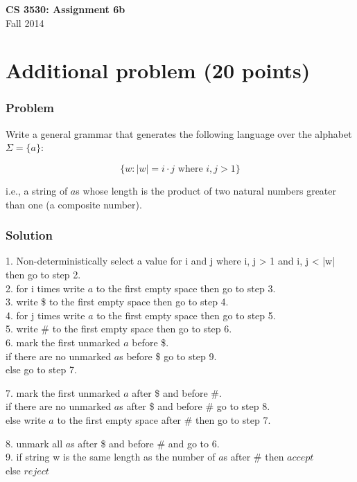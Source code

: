 \documentclass{article}
\begin{document}
\begin{center}
\textbf{\Large CS 3530: Assignment 6b} \\[2mm]
Fall 2014
\end{center}

\raggedright

\section*{Additional problem (20 points)}

\subsubsection*{Problem}

Write a general grammar that generates the following language over the alphabet $\Sigma=\{a\}$:

$$\{w: |w|=i\cdot j\text{ where }i,j>1\}$$

i.e., a string of $a$s whose length is the product of two natural numbers greater than one (a composite number).

\subsubsection*{Solution}


1. Non-deterministically select a value for i and j where i, j > 1 and i, j < |w| then go to step 2.\\
2. for i times write $a$ to the first empty space then go to step 3.\\
3. write \$ to the first empty space then go to step 4.\\
4. for j times write $a$ to the first empty space then go to step 5.\\
5. write \# to the first empty space then go to step 6.\\


6. mark the first unmarked $a$ before \$. \\ \parindent=12pt
   if there are no unmarked $a$s before \$ go to step 9. \\
   else go to step 7. \\ \parindent=0pt
   
7. mark the first unmarked $a$ after \$ and before \#. \\ \parindent=12pt
   if there are no unmarked $a$s after \$ and before \# go to step 8. \\
   else write $a$ to the first empty space after \# then go to step 7. \\ \parindent=0pt

8. unmark all $a$s after \$ and before \# and go to 6. \\

9. if string w is the same length as the number of $a$s after \# then $accept$ \\ \parindent=12pt
   else $reject$
\end{document}
